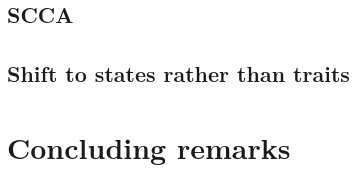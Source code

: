 \subsection{SCCA}
%
%

\subsection{Shift to states rather than traits}

%
%
%


\section{Concluding remarks}
\label{ch:discussion:summary}
